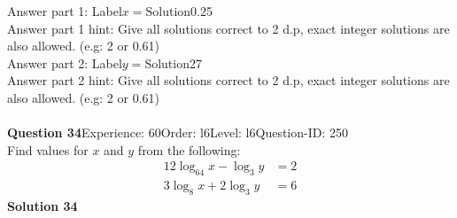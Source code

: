 \documentclass{article}
\begin{document}
Answer part 1: \hspace{10pt}Label\hspace{10pt}$x=$\hspace{10pt}Solution\hspace{10pt}0.25\\
Answer part 1 hint: \hspace{15pt}Give all solutions correct to 2 d.p, exact integer solutions are also allowed. (e.g: 2 or 0.61)\\
Answer part 2: \hspace{10pt}Label\hspace{10pt}$y=$\hspace{10pt}Solution\hspace{10pt}27\\
Answer part 2 hint: \hspace{15pt}Give all solutions correct to 2 d.p, exact integer solutions are also allowed. (e.g: 2 or 0.61)\\
\\[4pt]
\noindent\textbf{Question 34}\hspace{20pt}Experience: 60\hspace{20pt}Order: l6\hspace{20pt}Level: l6\hspace{20pt}Question-ID: 250\\[2pt]
Find values for $x$ and $y$ from the following:
\begin{align*}
12\log_{64}x-\log_{3}y&=2\\[2pt]
3\log_{8}x+2\log_{3}y&=6
\end{align*}
\noindent\textbf{Solution 34}\\[2pt]
\end{document}
